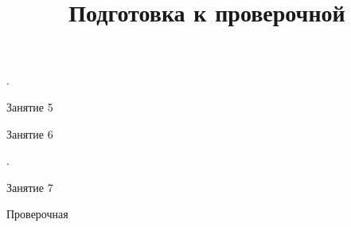\begin{homework}[number=2]
	\begin{listofex}
		\item .
	\end{listofex}
\end{homework}

\begin{class}[number=5]
	\begin{listofex}
		\item Занятие 5
	\end{listofex}
\end{class}

\begin{class}[number=6]
	\begin{listofex}
		\item Занятие 6
	\end{listofex}
\end{class}

\begin{homework}[number=4]
	\begin{listofex}
		\item .
	\end{listofex}
\end{homework}

\begin{class}[number=7]
	\title{Подготовка к проверочной}
	\begin{listofex}
		\item Занятие 7
	\end{listofex}
\end{class}

\begin{exam}
	\begin{listofex}
		\item Проверочная
	\end{listofex}
\end{exam}
